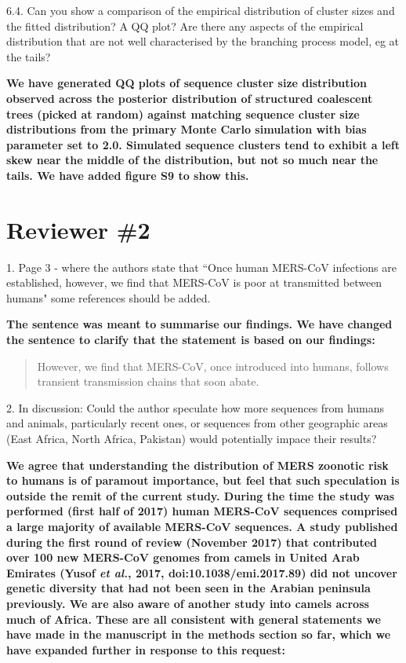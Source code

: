 \documentclass[11pt,oneside,letterpaper]{article}
\begin{document}
6.4. Can you show a comparison of the empirical distribution of cluster sizes and the fitted distribution? A QQ plot? Are there any aspects of the empirical distribution that are not well characterised by the branching process model, eg at the tails?

\textbf{We have generated QQ plots of sequence cluster size distribution observed across the posterior distribution of structured coalescent trees (picked at random) against matching sequence cluster size distributions from the primary Monte Carlo simulation with bias parameter set to 2.0. Simulated sequence clusters tend to exhibit a left skew near the middle of the distribution, but not so much near the tails. We have added figure S9 to show this.}


\section*{Reviewer \#2}

1. Page 3 - where the authors state that ``Once human MERS-CoV infections are established, however, we find that MERS-CoV is poor at transmitted between humans" some references should be added.

\textbf{The sentence was meant to summarise our findings. We have changed the sentence to clarify that the statement is based on our findings:}

\begin{quotation}
However, we find that MERS-CoV, once introduced into humans, follows transient transmission chains that soon abate.
\end{quotation}

2. In discussion: Could the author speculate how more sequences from humans and animals, particularly recent ones, or sequences from other geographic areas (East Africa, North Africa, Pakistan) would potentially impace their results?

\textbf{We agree that understanding the distribution of MERS zoonotic risk to humans is of paramout importance, but feel that such speculation is outside the remit of the current study.
During the time the study was performed (first half of 2017) human MERS-CoV sequences comprised a large majority of available MERS-CoV sequences.
A study published during the first round of review (November 2017) that contributed over 100 new MERS-CoV genomes from camels in United Arab Emirates (Yusof \textit{et al.}, 2017, doi:10.1038/emi.2017.89) did not uncover genetic diversity that had not been seen in the Arabian peninsula previously.
We are also aware of another study into camels across much of Africa.
These are all consistent with general statements we have made in the manuscript in the methods section so far, which we have expanded further in response to this request:}
\end{document}

